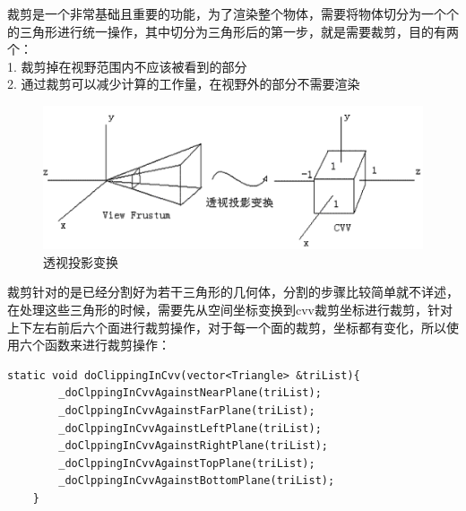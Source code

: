     \begin{spacing}{2.5}
    裁剪是一个非常基础且重要的功能，为了渲染整个物体，需要将物体切分为一个个的三角形进行统一操作，其中切分为三角形后的第一步，就是需要裁剪，目的有两个：\\
    1. 裁剪掉在视野范围内不应该被看到的部分\\
    2. 通过裁剪可以减少计算的工作量，在视野外的部分不需要渲染\\
    \begin{figure}[H]
		\centering
		\includegraphics[width=1.0\textwidth]{images/cvv.png}
		\caption{透视投影变换}
		\label{line}
	\end{figure}
		
		
		
	裁剪针对的是已经分割好为若干三角形的几何体，分割的步骤比较简单就不详述，在处理这些三角形的时候，需要先从空间坐标变换到cvv裁剪坐标进行裁剪，针对上下左右前后六个面进行裁剪操作，对于每一个面的裁剪，坐标都有变化，所以使用六个函数来进行裁剪操作：
    \end{spacing}
    \begin{lstlisting}
static void doClippingInCvv(vector<Triangle> &triList){
        _doClppingInCvvAgainstNearPlane(triList);
        _doClppingInCvvAgainstFarPlane(triList);
        _doClppingInCvvAgainstLeftPlane(triList);
        _doClppingInCvvAgainstRightPlane(triList);
        _doClppingInCvvAgainstTopPlane(triList);
        _doClppingInCvvAgainstBottomPlane(triList);
    }
	\end{lstlisting}

